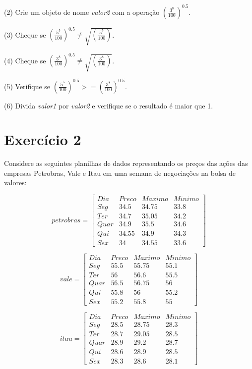 \documentclass[
  letterpaper,
  DIV=11,
  numbers=noendperiod]{scrreprt}
\begin{document}
(2) Crie um objeto de nome \emph{valor2} com a operação
\(\left(\frac{3^8}{100}\right)^{0.5}\).

(3) Cheque se
\(\left(\frac{5^5}{100}\right)^{0.5} \neq \sqrt{\left(\frac{5^5}{100}\right)}\).

(4) Cheque se
\(\left(\frac{3^8}{100}\right)^{0.5} \neq \sqrt{\left(\frac{3^8}{100}\right)}\).

(5) Verifique se
\(\left(\frac{5^5}{100}\right)^{0.5}  >= \left(\frac{3^8}{100}\right)^{0.5}\).

(6) Divida \emph{valor1} por \emph{valor2} e verifique se o resultado é
maior que 1.

\section{Exercício 2}\label{exercuxedcio-2}

Considere as seguintes planilhas de dados representando os preços das
ações das empresas Petrobras, Vale e Itau em uma semana de negociações
na bolsa de valores:

\[
petrobras = \left[
\begin{array}{c|ccc}
Dia & Preco & Maximo & Minimo \\ \hline
Seg & 34.5 & 34.75 & 33.8\\
Ter & 34.7 & 35.05 & 34.2\\
Quar & 34.9 & 35.5 & 34.6\\
Qui & 34.55 & 34.9 & 34.3\\
Sex & 34 & 34.55 & 33.6
\end{array}
\right]
\]

\[
vale = \left[
\begin{array}{c|ccc}
Dia & Preco & Maximo & Minimo \\ \hline
Seg & 55.5 & 55.75 & 55.1\\
Ter & 56 & 56.6 & 55.5\\
Quar & 56.5 & 56.75 & 56\\
Qui & 55.8 & 56 & 55.2\\
Sex & 55.2 & 55.8 & 55
\end{array}
\right]
\]

\[
itau = \left[
\begin{array}{c|ccc}
Dia & Preco & Maximo & Minimo \\ \hline
Seg & 28.5 & 28.75 & 28.3\\
Ter & 28.7 & 29.05 & 28.5\\
Quar & 28.9 & 29.2 & 28.7\\
Qui & 28.6 & 28.9 & 28.5\\
Sex & 28.3 & 28.6 & 28.1
\end{array}
\right]
\]
\end{document}
